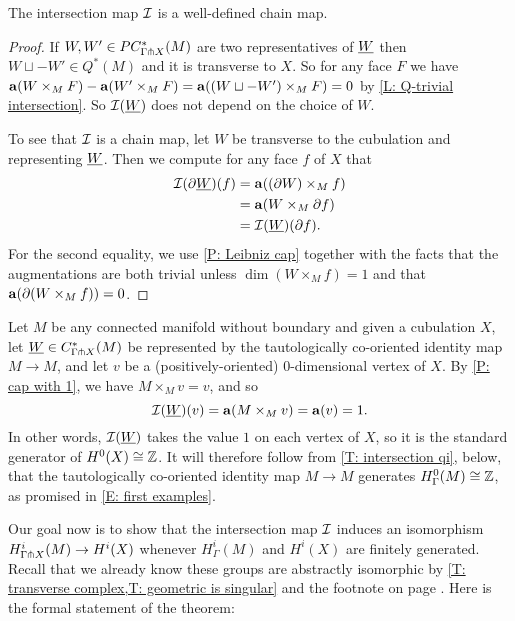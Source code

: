 \begin{proposition}
	The intersection map $\mathcal{I}$ is a well-defined chain map.
\end{proposition}

\begin{proof}
	If $W, W' \in PC^*_{\Gamma \pitchfork X}(M)$ are two representatives of $\underline{W}$ then $W \sqcup -W' \in Q^*(M)$ and it is transverse to $X$.
	So for any face $F$ we have $\mathbf{a}(W \times_M F)-\mathbf{a}(W' \times_M F) = \mathbf{a}((W \sqcup -W') \times_M F) = 0$ by \cref{L: Q-trivial intersection}.
	So $\mathcal{I}(\underline{W})$ does not depend on the choice of $W$.

	To see that $\mathcal{I}$ is a chain map, let $W$ be transverse to the cubulation and representing $\underline{W}$.
	Then we compute for any face $f$ of $X$ that
	\begin{align*}
		\mathcal{I}(\partial\underline{W})(f)& = \mathbf{a}((\partial W) \times_M f)\\
		& = \mathbf{a}(W \times_M \partial f)\\
		& = \mathcal{I}(\underline{W})(\partial f).
	\end{align*}
	For the second equality, we use \cref{P: Leibniz cap} together with the facts that the augmentations are both trivial unless $\dim(W \times_M f) = 1$ and that $\mathbf{a}(\partial (W \times_M f)) = 0$.
\end{proof}

\begin{example}\label{E: coho 0 generator}
	Let $M$ be any connected manifold without boundary and given a cubulation $X$, let $\underline{W} \in C^*_{\Gamma \pitchfork X}(M)$ be represented by the tautologically co-oriented identity map $M \to M$, and let $v$ be a (positively-oriented) $0$-dimensional vertex of $X$.
	By \cref{P: cap with 1}, we have $M \times_M v = v$, and so
	\[\mathcal{I}(\underline{W})(v) = \mathbf{a}(M \times_M v) = \mathbf{a}(v) = 1.\]
	In other words, $\mathcal{I}(\underline{W})$ takes the value $1$ on each vertex of $X$, so it is the standard generator of $H^0(X) \cong \mathbb{Z}$.
	It will therefore follow from \cref{T: intersection qi}, below, that the tautologically co-oriented identity map $M \to M$ generates $H^0_\Gamma(M) \cong \mathbb{Z}$, as promised in \cref{E: first examples}.
\end{example}

Our goal now is to show that the intersection map $\mathcal{I}$ induces an isomorphism $H^i_{\Gamma \pitchfork X}(M) \to H^i(X)$ whenever $H^i_\Gamma(M)$ and $H^i(X)$ are finitely generated.
Recall that we already know these groups are abstractly isomorphic by \cref{T: transverse complex,T: geometric is singular} and the footnote on page \pageref{FN: cubical and singular}.
Here is the formal statement of the theorem:

